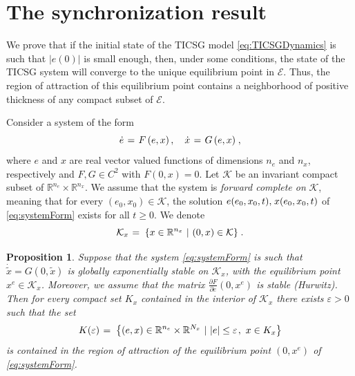\documentclass{ifacconf}
\newtheorem{proposition}[theorem]{Proposition}
\newcommand{\rline}  {{\mathbb R}}
\renewcommand{\e}    {{\varepsilon}}
\newcommand{\m}      {{\hbox{\hskip 1pt}}}
\newcommand{\Emscr}  {{\mathcal{E}}}
\newcommand{\Kmscr}  {{\mathcal{K}}}
\begin{document}
\section{The synchronization result} \label{sec6} %
 
We prove that if the initial state of the TICSG model
\eqref{eq:TICSGDynamics} is such that $|e(0)|$ is small enough, then,
under some conditions, the state of the TICSG system will converge to
the unique equilibrium point in $\Emscr$. Thus, the region of
attraction of this equilibrium point contains a neighborhood of
positive thickness of any compact subset of $\Emscr$.

Consider a system of the form
\begin{equation} \label{eq:systemForm}
   \dot{e} \m=\m F\left(e,x\right),\quad \dot{x} \m=\m
   G\left(e,x\right) \m,
\end{equation}
where $e$ and $x$ are real vector valued functions of dimensions $n_e$ 
and $n_x$, respectively and $F,G\in C^2$ with $F(0,x)=0$. Let $\Kmscr$
be an invariant compact subset of $\rline^{n_e}\times\rline^{n_x}$. We
assume that the system is {\em forward complete on} $\Kmscr$, meaning
that for every $(e_0,x_0)\in\Kmscr$, the solution $e(e_0,x_0,t),\m 
x(e_0,x_0,t)$ of \eqref{eq:systemForm} exists for all $t\geq 0$. We 
denote \vspace{-1mm}
$$ \Kmscr_x \m=\m \left\{x\in\rline^{n_x}\ |\ (0,x)\in\Kmscr \right\}
   \m.$$

\begin{proposition} \label{Nahal_Zin}
Suppose that the system \eqref{eq:systemForm} is such that $\dot{
\tilde x}=G(0,\tilde{x})$ is globally exponentially stable on 
$\Kmscr_x$, with the equilibrium point $x^e\in\Kmscr_x$. Moreover, we
assume that the matrix $\frac{\partial F}{\partial e}(0,x^e)$ is 
stable (Hurwitz). Then for every compact set $K_x$ contained in the
interior of $\Kmscr_x$ there exists $\e>0$ such that the set
$$ K(\e) \m=\m \left\{ (e,x)\in\rline^{n_e}\times\rline^{N_x}\ |\
   |e|\leq\e\m,\ x\in K_x \right\}$$
is contained in the region of attraction of the equilibrium point
$(0,x^e)$ of \eqref{eq:systemForm}.
\end{proposition}
\end{document}
